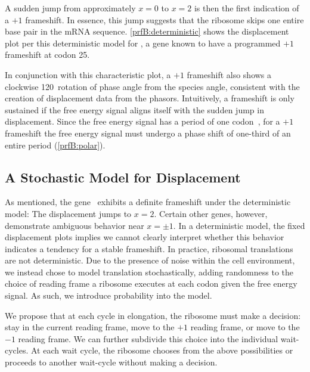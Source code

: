 \documentclass[12pt, draft]{article}
\numberwithin{equation}{section}
\begin{document}
A sudden jump from approximately $x = 0$ to $x = 2$ is then the first indication of a $+1$ frameshift.
In essence, this jump suggests that the ribosome skips one entire base pair in the mRNA sequence.
\autoref{prfB:deterministic} shows the displacement plot per this deterministic model for \prfB, 
a gene known to have a programmed $+1$ frameshift at codon 25.

In conjunction with this characteristic plot, a $+1$ frameshift also shows a clockwise 120\degree\
rotation of phase angle from the species angle, consistent with the creation of displacement data from the phasors.
Intuitively, a frameshift is only sustained if the free energy signal aligns itself with the sudden jump in displacement.
Since the free energy signal has a period of one codon~\cite{lalit:mechanics}, for a $+1$ frameshift the free energy signal
must undergo a phase shift of one-third of an entire period (\autoref{prfB:polar}).

\subsection{A Stochastic Model for Displacement}
\label{stochastic}


As mentioned, the gene \prfB\ exhibits a definite frameshift under the deterministic model: The displacement jumps to $x=2$.
Certain other genes, however, demonstrate ambiguous behavior near $x = \pm 1$.
In a deterministic model, the fixed displacement plots implies
we cannot clearly interpret whether this behavior indicates a tendency for a stable frameshift.
In practice, ribosomal translations are not deterministic. Due to the presence of
noise within the cell environment, we instead chose to model translation stochastically, adding
randomness to the choice of reading frame a ribosome executes at each codon given the free energy signal.
As such, we introduce probability into the model.

We propose that at each cycle in elongation, the ribosome must make a decision: stay in the current reading frame,
move to the $+1$ reading frame,
or move to the $-1$ reading frame.  We can further subdivide this choice into the individual wait-cycles.
At each wait cycle, the ribosome chooses from the above possibilities or proceeds to another wait-cycle without making a decision.
\end{document}
